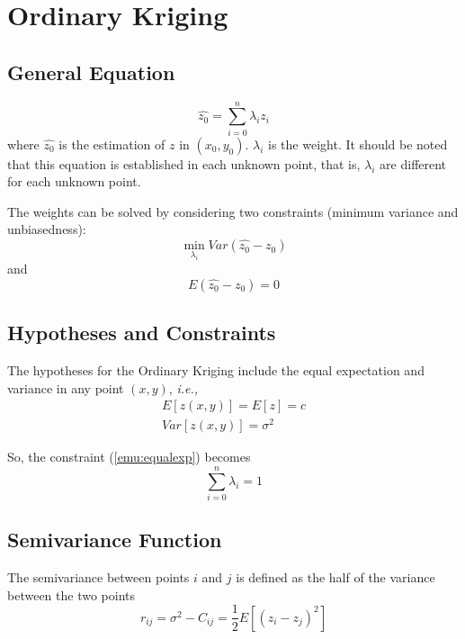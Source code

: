 \documentclass{article}
\begin{document}
\section{Ordinary Kriging}

\subsection{General Equation}
\begin{equation}
\label{emu:ok}
    \hat{z_0}=\sum_{i=0}^{n}\lambda_iz_i
\end{equation}
where $\hat{z_0}$ is the estimation of $z$ in $(x_0, y_0)$. $\lambda_i$ is the weight. It should be noted that this equation is established in each unknown point, that is, $\lambda_i$ are different for each unknown point.

The weights can be solved by considering two constraints (minimum variance and unbiasedness):
\begin{equation}
\label{emu:res2}
    \min\limits_{\lambda_i}Var(\hat{z_0}-z_0)
\end{equation}
and 
\begin{equation}
\label{emu:equalexp}
    E(\hat{z_0}-z_0)=0
\end{equation}

\subsection{Hypotheses and Constraints}
The hypotheses for the Ordinary Kriging include the equal expectation and variance in any point $(x,y)$, \textit{i.e.,}
\begin{align}
    E[z(x,y)]=E[z]=c\\
    Var[z(x,y)]=\sigma^2
\end{align}

So, the constraint (\ref{emu:equalexp}) becomes
\begin{equation}
\label{emu:res1}
    \sum_{i=0}^n\lambda_i=1
\end{equation}

\subsection{Semivariance Function}
The semivariance between points $i$ and $j$ is defined as the half of the variance between the two points
\begin{equation}
    r_{ij}=\sigma^2-C_{ij}=\frac{1}{2}E[(z_i-z_j)^2]
\end{equation}
\end{document}
